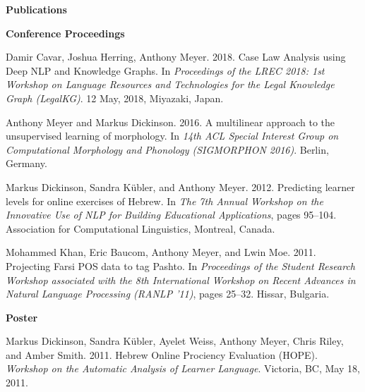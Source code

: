 \begin{singlespace}

%
\vspace{20pt}
\centerline{\Large \textbf{Publications}}
\vspace{10pt} 
\centerline{\large \textbf{Conference Proceedings}}
\begin{description}
\item Damir Cavar, Joshua Herring, Anthony Meyer. 2018. Case Law Analysis using Deep NLP and Knowledge Graphs. 
In \emph{Proceedings of the LREC 2018: 1st Workshop on Language Resources and Technologies for the Legal Knowledge Graph (LegalKG)}. 12 May, 2018, Miyazaki, Japan.
\item Anthony Meyer and Markus Dickinson. 2016. A multilinear approach to the unsupervised
learning of morphology. In \emph{14th ACL Special Interest Group on Computational Morphology and
Phonology (SIGMORPHON 2016)}. Berlin, Germany.
\item Markus Dickinson, Sandra K\"{u}bler, and Anthony Meyer. 2012. Predicting learner levels for online
exercises of Hebrew. In \emph{The 7th Annual Workshop on the Innovative Use of NLP for Building
Educational Applications}, pages 95--104. Association for Computational Linguistics, Montreal,
Canada.
\item Mohammed Khan, Eric Baucom, Anthony Meyer, and Lwin Moe. 2011. Projecting Farsi POS
data to tag Pashto. In \emph{Proceedings of the Student Research Workshop associated with the 8th
International Workshop on Recent Advances in Natural Language Processing (RANLP '11)},
pages 25--32. Hissar, Bulgaria.
\end{description}
\vspace{-3pt}
\centerline{\large \textbf{Poster}} %
\begin{description}
\item Markus Dickinson, Sandra K\"{u}bler, Ayelet Weiss, Anthony Meyer, Chris Riley, and Amber Smith.
2011. Hebrew Online Prociency Evaluation (HOPE). \emph{Workshop on the Automatic Analysis of
Learner Language}. Victoria, BC, May 18, 2011.

\end{description}
\end{singlespace}
